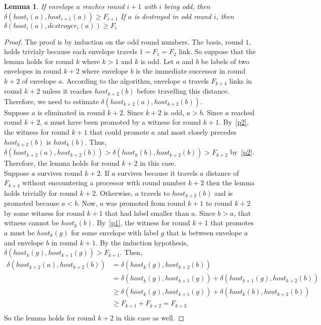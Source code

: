 \documentclass{article}
\newtheorem{lemma}{Lemma}
\begin{document}
\begin{lemma}\label{p3}
    If envelope $a$ reaches round $i+1$ with $i$ being odd, then $\delta(host_i(a), host_{i+1}(a)) \geq F_{i+1}$
    If $a$ is destroyed in odd round $i$, then $\delta(host_i(a), destroyer_i(a)) \geq F_i$
\end{lemma}
\begin{proof}
    The proof is by induction on the odd round numbers. The basis, round $1$, holds trivialy because each envelope travels $1 = F_1 = F_2$ link. So suppose that the lemma holds for round $k$ where $k > 1$ and $k$ is odd. Let $a$ and $b$ be labels of two envelopes in round $k + 2$ where envelope $b$ is the immediate successor in round $k + 2$ of envelope $a$. According to the algorithm, envelope $a$ travels $F_{k+4}$ links in round $k + 2$ unless it reaches $host_{k+2}(b)$ before travelling this distance. Therefore, we need to estimate $\delta(host_{k+2}(a), host_{k+2}(b))$.
    \\
    Suppose $a$ is eliminated in round $k+2$. Since $k+2$ is odd, $a > b$. Since $a$ reached round $k + 2$, $a$ must have been promoted by a witness for round $k + 1$. By~\cref{p2}, the witness for round $k+1$ that could promote $a$ and most closely precedes $host_{k+2}(b)$ is $host_k(b)$. Thus, $\delta(host_{k+2}(a), host_{k+2}(b)) > \delta(host_k(b), host_{k+2}(b)) > F_{k+2}$ by~\cref{p2}. Therefore, the lemma holds for round $k + 2$ in this case.
    \\
    Suppose $a$ survives round $k + 2$. If $a$ survives because it travels $a$ distance of $F_{k+4}$ without encountering a processor with round number $k + 2$ then the lemma holds trivially for round $k + 2$. Otherwise, $a$ travels to $host_{k+2}(b)$ and is promoted because $a < b$. Now, $a$ was promoted from round $k + 1$ to round $k + 2$ by some witness for round $k + 1$ that had label smaller than $a$. Since $b > a$, that witness cannot be $host_k(b)$. By~\cref{p1}, the witness for round $k + 1$ that promotes $a$ must be $host_k(g)$ for some envelope with label $g$ that is between envelope $a$ and envelope $b$ in round $k + 1$. By the induction hypothesis, $\delta(host_k(g), host_{k+1}(g)) > F_{k+1}$. Then, 
\[
\begin{aligned}    
    \delta(host_{k+2}(a), host_{k+2}(b)) & =    \delta(host_k(g), host_{k+2}(b)) \\
                                         & =    \delta(host_k(g), host_{k+1}(g)) + \delta(host_{k+1}(g), host_{k+2}(b)) \\
                                         & \geq \delta(host_k(g), host_{k+1}(g)) + \delta(host_k(b), host_{k+2}(b)) \\
                                         & \geq F_{k+1} + F_{k+2} = F_{k+3} \\
\end{aligned}
\]
    So the lemma holds for round $k + 2$ in this case as well.
\end{proof}
\end{document}
